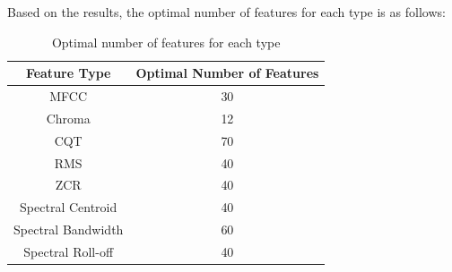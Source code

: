 Based on the results, the optimal number of features for each type is as follows:
\begin{table}[h]
    \centering
    \small
    \begin{tabular}{|c|c|}
        \hline
        \textbf{Feature Type} & \textbf{Optimal Number of Features} \\
        \hline
        MFCC                  & 30                                  \\
        Chroma                & 12                                  \\
        CQT                   & 70                                  \\
        RMS                   & 40                                  \\
        ZCR                   & 40                                  \\
        Spectral Centroid     & 40                                  \\
        Spectral Bandwidth    & 60                                  \\
        Spectral Roll-off     & 40                                  \\
        \hline
    \end{tabular}
    \caption{Optimal number of features for each type}
    \label{tab:optimal_features}
\end{table}

